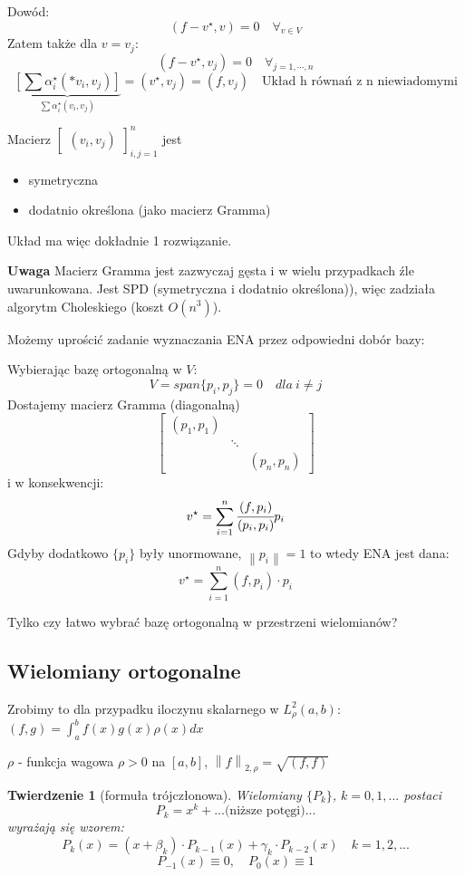 \documentclass[hidelinks,a4paper,fleqn,oneside]{book}
\newcommand{\norm}[1]{\left\lVert#1\right\rVert}
\newtheorem{twierdz}{Twierdzenie}
\begin{document}
Dowód:
\[
	(f- v^\star, v) = 0 \quad \forall_{v \in V}
\]
Zatem także dla $v = v_j$:
\[
	(f-v^\star, v_j) = 0 \quad \forall_{j = 1, \cdots, n}
\]
\[
	\underbrace{[\sum \alpha_i^\star (*v_i, v_j)]}_{\sum \alpha_i^\star(v_i, v_j)} = (v^\star, v_j) = (f, v_j) \quad \textrm{Układ h równań z n niewiadomymi}
\]

Macierz $\left[ \begin{array}{c} (v_i, v_j) \end{array} \right]_{i, j=1}^n$ jest
\begin{itemize}
	\item symetryczna
	\item dodatnio określona (jako macierz Gramma)
\end{itemize}

Układ ma więc dokładnie 1 rozwiązanie.

\textbf{Uwaga} Macierz Gramma jest zazwyczaj gęsta i w wielu przypadkach źle uwarunkowana. Jest SPD (symetryczna i dodatnio określona)), więc zadziała algorytm Choleskiego (koszt $O(n^3)$).

Możemy uprościć zadanie wyznaczania ENA przez odpowiedni dobór bazy:

Wybierając bazę ortogonalną w $V$:
\[
	V = span\{p_i, p_j\} = 0 \quad dla\ i \neq j
\]
Dostajemy macierz Gramma (diagonalną)
\[
	\left[
		\begin{array}{ccc}
		(p_1,p_1) &  &  \\
		 & \ddots & \\
		 &  & (p_n, p_n)
		\end{array}
	\right]
\]
i w konsekwencji:
\[
	v^\star = \sum_{i=1}^n \cfrac{(f, p_i)}{(p_i, p_i)}p_i
\]
Gdyby dodatkowo $\{p_i\}$ były unormowane, $\norm{p_i} = 1$ to wtedy ENA jest dana:
\[
	v^\star = \sum_{i=1}^{n}(f, p_i) \cdot p_i
\]

Tylko czy łatwo wybrać bazę ortogonalną w przestrzeni wielomianów?

\subsection{Wielomiany ortogonalne}

Zrobimy to dla przypadku iloczynu skalarnego w $L^2_\rho(a, b)$: $(f, g) = \int_a^b f(x)g(x)\rho(x)dx$

$\rho$ - funkcja wagowa $\rho > 0$ na $[a, b]$, $\norm{f}_{2, \rho} = \sqrt{(f, f)}$

\begin{twierdz}[formuła trójczłonowa]
	Wielomiany $\{P_k\}$, $k = 0, 1, ...$ postaci
	\[
		P_k = x^k + ...\textrm{(niższe potęgi)}...
	\]
	wyrażają się wzorem:
	\[
		P_k(x) = (x + \beta_k) \cdot P_{k-1}(x) + \gamma_k \cdot P_{k-2}(x) \quad k=1, 2, ...
	\]
	\[
		P_{-1}(x) \equiv 0, \quad P_0(x) \equiv 1
	\]
\end{twierdz}
\end{document}

